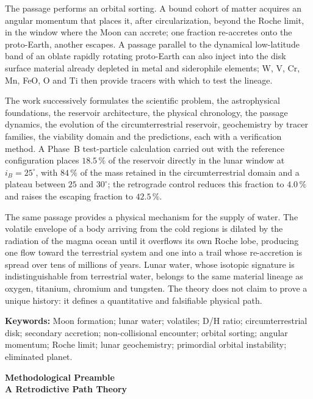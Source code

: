 \documentclass[11pt,a4paper,openany]{report}
\begin{document}
The passage performs an orbital sorting. A bound cohort of matter acquires an angular momentum
that places it, after circularization, beyond the Roche limit, in the window where the Moon can
accrete; one fraction re-accretes onto the proto-Earth, another escapes. A passage parallel to the
dynamical low-latitude band of an oblate rapidly rotating proto-Earth can also inject into the disk
surface material already depleted in metal and siderophile elements; W, V, Cr, Mn, FeO, O and Ti
then provide tracers with which to test the lineage.

The work successively formulates the scientific problem, the astrophysical foundations, the
reservoir architecture, the physical chronology, the passage dynamics, the evolution of the
circumterrestrial reservoir, geochemistry by tracer families, the viability domain and the
predictions, each with a verification method. A Phase~B test-particle calculation carried out with
the reference configuration places $18.5\,\%$ of the reservoir directly in the lunar window at
$i_B=25^\circ$, with $84\,\%$ of the mass retained in the circumterrestrial domain and a plateau
between $25$ and $30^\circ$; the retrograde control reduces this fraction to $4.0\,\%$ and raises
the escaping fraction to $42.5\,\%$.

The same passage provides a physical mechanism for the supply of water. The volatile envelope of a
body arriving from the cold regions is dilated by the radiation of the magma ocean until it
overflows its own Roche lobe, producing one flow toward the terrestrial system and one into a
trail whose re-accretion is spread over tens of millions of years. Lunar water, whose isotopic
signature is indistinguishable from terrestrial water, belongs to the same material lineage as
oxygen, titanium, chromium and tungsten. The theory does not claim to prove a unique history: it
defines a quantitative and falsifiable physical path.

\bigskip
\noindent\textbf{Keywords:} Moon formation; lunar water; volatiles; D/H ratio; circumterrestrial
disk; secondary accretion; non-collisional encounter; orbital sorting; angular momentum; Roche
limit; lunar geochemistry; primordial orbital instability; eliminated planet.


\clearpage
\thispagestyle{plain}
{}
\begin{center}
{\Large\bfseries Methodological Preamble}\\[4pt]
{\large\bfseries A Retrodictive Path Theory}
\end{center}
\medskip
\end{document}
